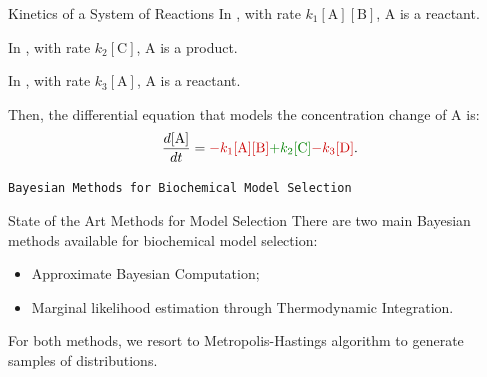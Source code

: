 \documentclass{beamer}
\begin{document}
\begin{frame}{Kinetics of a System of Reactions}
In , with rate 
{\color{red!80!black}$k_1[\text{A}][\text{B}]$}, A is a reactant.
\pause

In , with rate 
{\color{green!50!black}$k_2[\text{C}]$}, A is a product.
\pause

In , with rate 
{\color{red!80!black}$k_3[\text{A}]$}, A is a reactant.
\pause

Then, the differential equation that models the concentration change of 
A is:
\pause
\begin{equation*}
    \frac{d[\text{A}]}{dt} = 
        {\color{red!80!black}- k_1[\text{A}][\text{B}]}
        {\color{green!50!black}+ k_2[\text{C}]}
        {\color{red!80!black}- k_3[\text{D}]}.
\end{equation*}
\end{frame}


\begin{frame}{}
\begin{center}
\texttt{Bayesian Methods for Biochemical Model Selection}
\end{center}
\end{frame}

\begin{frame}{State of the Art Methods for Model Selection}
There are two main Bayesian methods available for biochemical model 
selection:
\begin{itemize}
\pause
\item{Approximate Bayesian Computation;}

\pause
\item{Marginal likelihood estimation through Thermodynamic Integration.}
\end{itemize}

\pause
For both methods, we resort to Metropolis-Hastings algorithm to generate
samples of distributions.
\end{frame}
\end{document}
